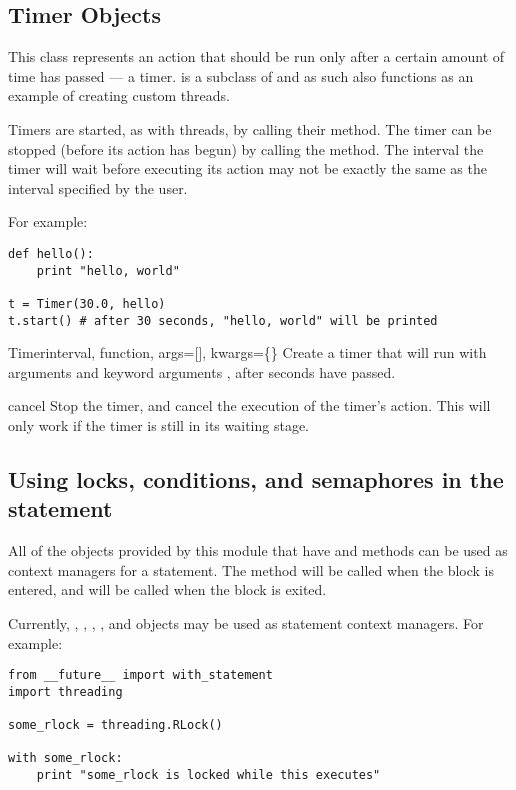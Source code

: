 \subsection{Timer Objects \label{timer-objects}}

This class represents an action that should be run only after a
certain amount of time has passed --- a timer.   is a
subclass of  and as such also functions as an example of
creating custom threads.

Timers are started, as with threads, by calling their 
method.  The timer can be stopped (before its action has begun) by
calling the  method.  The interval the timer will
wait before executing its action may not be exactly the same as the
interval specified by the user.

For example:
\begin{verbatim}
def hello():
    print "hello, world"

t = Timer(30.0, hello)
t.start() # after 30 seconds, "hello, world" will be printed
\end{verbatim}

\begin{classdesc}{Timer}{interval, function, args=[], kwargs=\{\}}
Create a timer that will run  with arguments  and 
keyword arguments , after  seconds have passed.
\end{classdesc}

\begin{methoddesc}{cancel}{}
Stop the timer, and cancel the execution of the timer's action.  This
will only work if the timer is still in its waiting stage.
\end{methoddesc}

\subsection{Using locks, conditions, and semaphores in the 
statement \label{with-locks}}

All of the objects provided by this module that have  and
 methods can be used as context managers for a 
statement.  The  method will be called when the block is
entered, and  will be called when the block is exited.

Currently, , , , ,
and  objects may be used as 
statement context managers.  For example:

\begin{verbatim}
from __future__ import with_statement
import threading

some_rlock = threading.RLock()

with some_rlock:
    print "some_rlock is locked while this executes"
\end{verbatim}

